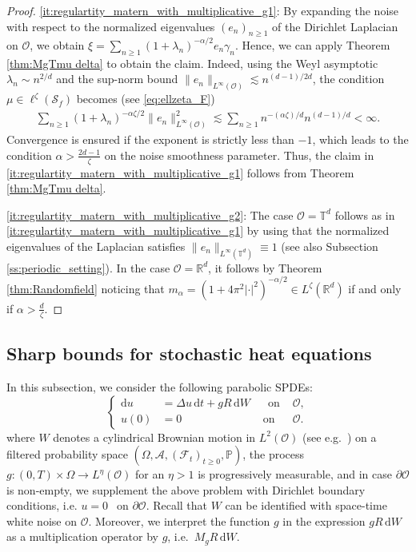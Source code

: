 \documentclass[reqno]{amsart}
\theoremstyle{plain}
\theoremstyle{remark}
\theoremstyle{plain}
\numberwithin{equation}{section}
\renewcommand\P{\mathbb{P}}
\newcommand\cO{\mathcal{O}}
\def\R{{\mathbb R}}
\renewcommand{\P}{{\mathbb P}}
\newcommand{\g}{\gamma}
\renewcommand{\O}{\Omega}
\newcommand{\T}{\mathbb{T}}
\newcommand{\di}{\mathrm{d}}
\newcommand{\1}{\one}
\newcommand{\Sf}{\mathcal{S}_{f}}
\begin{document}
\begin{proof}
\eqref{it:regulartity_matern_with_multiplicative_g1}: By expanding the noise with respect to the normalized eigenvalues $(e_n)_{n\geq 1}$ of the Dirichlet Laplacian on $\cO$, we obtain $\xi=\sum_{n\geq 1} (1+\lambda_n)^{-\alpha/2} e_n\g_n$. Hence, we can apply Theorem \ref{thm:MgTmu delta} to obtain the claim. Indeed, using the Weyl asymptotic $\lambda_n \sim n^{2/d}$ and the sup-norm bound $\|e_n\|_{L^\infty(\mathcal{O})} \lesssim n^{(d-1)/2d}$, the condition $\mu \in \ell^\zeta(\Sf)$ becomes (see \eqref{eq:ellzeta_F})
\begin{align}
    \sum_{n\geq 1} (1+\lambda_n)^{-\alpha \zeta/2} \|e_n\|_{L^\infty(\mathcal{O})}^2 
    \lesssim \sum_{n\geq 1} n^{-(\alpha\zeta)/d} n^{(d-1)/{d}} < \infty.
\end{align}
Convergence is ensured if the exponent is strictly less than $-1$, which leads to the condition  $\alpha > \frac{2d-1}{\zeta}$ on the noise smoothness parameter. Thus, the claim in \eqref{it:regulartity_matern_with_multiplicative_g1} follows from Theorem \ref{thm:MgTmu delta}.

\smallskip

\eqref{it:regulartity_matern_with_multiplicative_g2}: The case $\cO=\T^d$ follows as in \eqref{it:regulartity_matern_with_multiplicative_g1} by using that the normalized eigenvalues of the Laplacian satisfies $\|e_n\|_{L^\infty(\T^d)}\equiv 1$ (see also Subsection \ref{ss:periodic_setting}). In the case $\cO=\R^d$, it follows by Theorem \ref{thm:Randomfield} noticing that $m_\alpha = (1+4\pi^2|\cdot |^2)^{-\alpha/2}\in L^\zeta(\R^d)$ if and only if $\alpha>\frac{d}{\zeta}$. 
\end{proof}



\subsection{Sharp bounds for stochastic heat equations}
\label{ss:sharp_bounds_SPDEs}
In this subsection, we consider the following parabolic SPDEs: 
\begin{equation}
\label{eq:SPDE no drift}
\left\{
\begin{aligned}
\di u  & = \Delta u\, \di  t +  g R \,\di W &\ \  \text{ on }&\cO,\\ 
u(0)&=0 &\text{ on }&\cO.
\end{aligned}
\right.
\end{equation}
where $W$ denotes a cylindrical Brownian motion in $L^2(\cO)$ (see e.g.\ \cite[Definition 2.2]{AV25_survey}) on a filtered probability space $(\O,\mathcal{A},(\mathcal{F}_t)_{t\geq 0},\P)$, the process $
    g:(0,T)\times\Omega \to L^\eta(\cO)$ for an $\eta >1$ is progressively measurable, and in case $\partial\cO$ is non-empty, we supplement the above problem with Dirichlet boundary conditions, i.e. $u=0\ \  \text{ on }\partial\cO$.
Recall that $W$ can be identified with space-time white noise on $\cO$. Moreover, we interpret the function $g$ in the expression $g R \,\di W$  as a multiplication operator by $g$, i.e.\ $M_g R\, \di W$.
\end{document}
